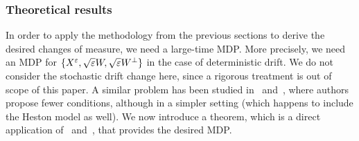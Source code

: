 \subsubsection{Theoretical results}
In order to apply the methodology from the previous sections to derive the desired changes of measure, we need a large-time MDP. More precisely, we need an MDP for $\{X^{\varepsilon},\sqrt{\varepsilon}W,\sqrt{\varepsilon}W^{\perp}\}$ in the case of deterministic drift. We do not consider the stochastic drift change here, since a rigorous treatment is out of scope of this paper.
A similar problem has been studied in~\cite[Theorem 2.1]{Morse2017ModerateDiffusions} and~\cite[Theorem 3.3]{Jacquier2019PathwisePricing}, where authors propose fewer conditions, although in a simpler setting (which happens to include the Heston model as well). %
We now introduce a theorem, which is a direct application of~\cite[Theorem~3.3]{Jacquier2019PathwisePricing} and~\cite[Theorem~2.1]{Morse2017ModerateDiffusions}, that provides the desired MDP.

